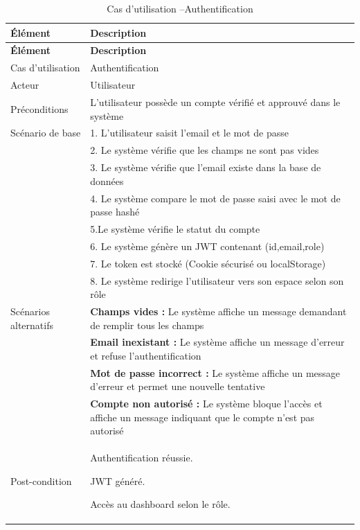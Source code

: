 \small %
\begin{longtable}{|l|p{12cm}|}
\caption{Cas d’utilisation –Authentification} \label{tab:authentification} \\
\hline
\textbf{Élément} & \textbf{Description} \\
\hline
\endfirsthead
\hline
\textbf{Élément} & \textbf{Description} \\
\hline
\endhead

Cas d’utilisation & 
 Authentification 
 \\
\hline
Acteur & 
 Utilisateur
 \\
\hline
Préconditions & 
 L'utilisateur possède un compte vérifié et approuvé dans le système

 \\
\hline
Scénario de base & 
1. L’utilisateur saisit  l'email  et le mot de passe \\
& 2. Le système vérifie que les champs ne sont pas vides \\
& 3. Le système vérifie que l’email existe dans la base de données\\
& 4. Le système compare le mot de passe saisi avec le mot de passe hashé\\
& 5.Le système vérifie le statut du compte  \\
& 6. Le système génère un JWT contenant (id,email,role)\\
& 7. Le token est stocké (Cookie sécurisé ou localStorage)\\
& 8. Le système redirige l’utilisateur vers son espace selon son rôle\\
\hline
Scénarios alternatifs & 
\textbf{Champs vides :}
 Le système affiche un message demandant de remplir tous les champs \\
& \textbf{Email inexistant :} Le système affiche un message d’erreur et refuse l’authentification \\
& \textbf{Mot de passe incorrect :} Le système affiche un message d’erreur et permet une nouvelle tentative \\
& \textbf{Compte non autorisé :} Le système bloque l’accès et affiche un message indiquant que le compte n’est pas autorisé \\
\hline
Post-condition & 

Authentification réussie.

JWT généré.

Accès au dashboard selon le rôle.
 \\
\hline
\end{longtable}


